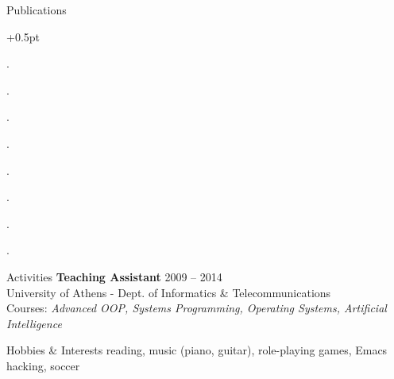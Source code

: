 \documentclass{resume}
\begin{document}
\begin{rSection}{Publications}
  \begin{rSubsection}{}{}{}{}
    \itemsep +0.5pt %
  \item {}.
  \item {}.
  \item {}.
  \item {}.
  \item {}.
  \item {}.
  \item {}.
  \item {}.
  \end{rSubsection}
\end{rSection}



\begin{rSection}{Activities}
  {\bf Teaching Assistant} \hfill {2009 -- 2014} \\
  University of Athens - Dept. of Informatics \& Telecommunications \\
  Courses: \emph{Advanced OOP, Systems Programming, Operating Systems,
    Artificial Intelligence} \\
\end{rSection}


\begin{rSection}{Hobbies \& Interests}
  reading, music (piano, guitar), role-playing games, Emacs hacking, soccer \\
\end{rSection}


\end{document}
